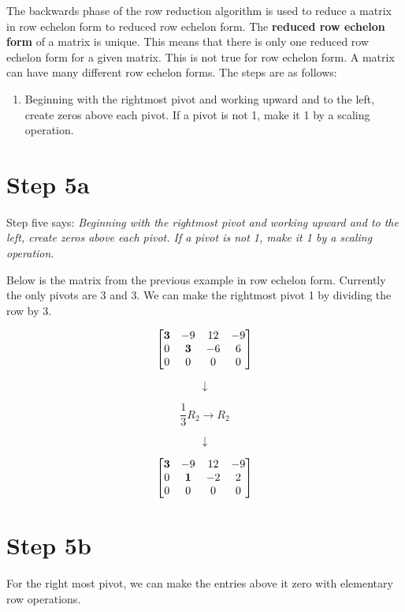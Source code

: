\documentclass[
  letterpaper,
  DIV=11,
  numbers=noendperiod]{scrreprt}
\providecommand{\tightlist}{%
  \setlength{\itemsep}{0pt}\setlength{\parskip}{0pt}}\usepackage{longtable,booktabs,array}
\begin{document}
The backwards phase of the row reduction algorithm is used to reduce a
matrix in row echelon form to reduced row echelon form. The
\textbf{reduced row echelon form} of a matrix is unique. This means that
there is only one reduced row echelon form for a given matrix. This is
not true for row echelon form. A matrix can have many different row
echelon forms. The steps are as follows:

\begin{enumerate}
\def\labelenumi{\arabic{enumi}.}
\setcounter{enumi}{4}
\tightlist
\item
  Beginning with the rightmost pivot and working upward and to the left,
  create zeros above each pivot. If a pivot is not 1, make it 1 by a
  scaling operation.
\end{enumerate}

\chapter{Step 5a}

Step five says: \emph{Beginning with the rightmost pivot and working
upward and to the left, create zeros above each pivot. If a pivot is not
1, make it 1 by a scaling operation.}

Below is the matrix from the previous example in row echelon form.
Currently the only pivots are 3 and 3. We can make the rightmost pivot 1
by dividing the row by 3.

\[
\begin{bmatrix}
    \bf{3} & -9 & 12 & -9 \\
    0 & \bf{3} & -6 & 6 \\
    0 & 0 & 0 & 0
\end{bmatrix}
\]

\[
\downarrow
\]

\[
\frac{1}{3}R_2 \rightarrow R_2
\]

\[
\downarrow
\]

\[
\begin{bmatrix}
    \bf{3} & -9 & 12 & -9 \\
    0 & \bf{1} & -2 & 2 \\
    0 & 0 & 0 & 0
\end{bmatrix}
\]

\chapter{Step 5b}

For the right most pivot, we can make the entries above it zero with
elementary row operations.
\end{document}
